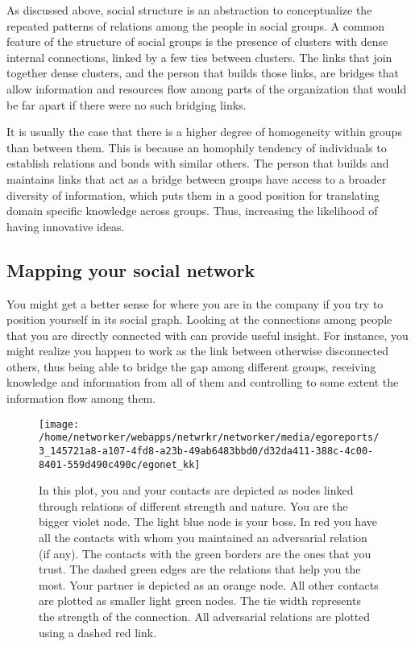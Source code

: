 \documentclass[a4paper,12pt]{article}
\begin{document}
As discussed above, social structure is an abstraction to conceptualize the repeated patterns of relations among the people in social groups. A common feature of the structure of social groups is the presence of clusters with dense internal connections, linked by a few ties between clusters. The links that join together dense clusters, and the person that builds those links, are bridges that allow information and resources flow among parts of the organization that would be far apart if there were no such bridging links.

It is usually the case that there is a higher degree of homogeneity within groups than between them. This is because an homophily tendency of individuals to establish relations and bonds with similar others. The person that builds and maintains links that act as a bridge between groups have access to a broader diversity of information, which puts them in a good position for translating domain specific knowledge across groups. Thus, increasing the likelihood of having innovative ideas.


\newpage


\subsection*{Mapping your social network}


You might get a better sense for where you are in the company if you try to position yourself in its social graph. Looking at the connections among people that you are directly connected with can provide useful insight. For instance, you might realize you happen to work as the link between otherwise disconnected others, thus being able to bridge the gap among different groups, receiving knowledge and information from all of them and controlling to some extent the information flow among them.


\begin{figure}[H]
\centering
\texttt{[image: /home/networker/webapps/netwrkr/networker/media/egoreports/3\_145721a8-a107-4fd8-a23b-49ab6483bbd0/d32da411-388c-4c00-8401-559d490c490c/egonet\_kk]}
\caption{In this plot, you and your contacts are depicted as nodes linked through relations of different strength and nature. You are the bigger violet node. The light blue node is your boss. In red you have all the contacts with whom you maintained an adversarial relation (if any). The contacts with the green borders are the ones that you trust. The dashed green edges are the relations that help you the most. Your partner is depicted as an orange node. All other contacts are plotted as smaller light green nodes. The tie width represents the strength of the connection. All adversarial relations are plotted using a dashed red link.}
\end{figure}
\end{document}
